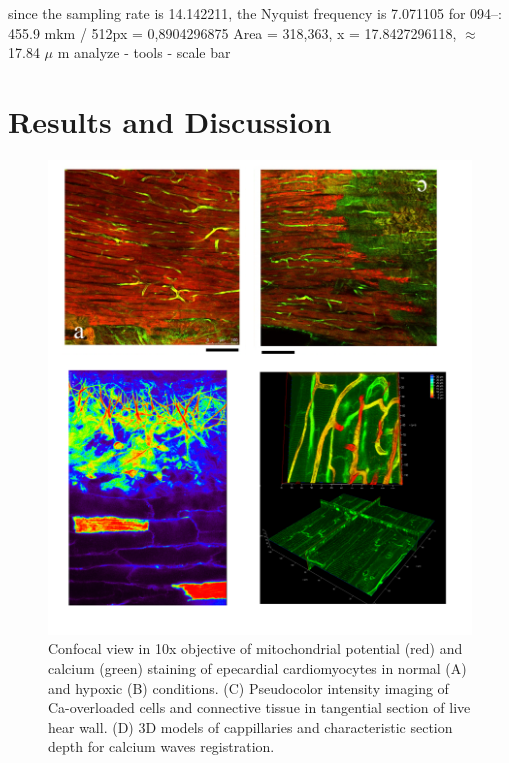 \documentclass{biophys-new}
\begin{document}
since the sampling rate is 14.142211, the Nyquist frequency is 7.071105
for 094--: 455.9 mkm / 512px = 0,8904296875
Area = 318,363, x = 17.8427296118, $\approx$ 17.84 $\mu$ m
analyze - tools - scale bar


\section*{Results and Discussion}



\begin{figure}[hbt!]
\centering
\includegraphics[width=0.8\linewidth]{fig1.png}
\caption{Confocal view in 10x objective of mitochondrial potential (red) and calcium (green) staining of epecardial cardiomyocytes in normal (A) and hypoxic (B) conditions. (C) Pseudocolor intensity imaging of Ca-overloaded cells and connective tissue in  tangential section of live hear wall. (D) 3D models of  cappillaries and characteristic section depth for calcium waves registration.}
\label{fig:fig1}
\end{figure}
\end{document}
